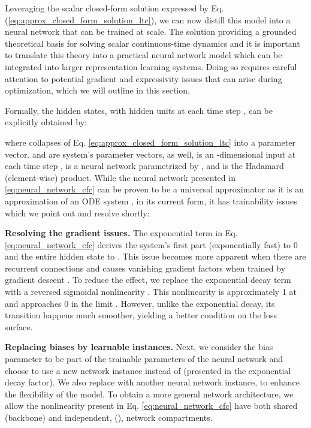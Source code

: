 \documentclass[12pt]{article}
\begin{document}
Leveraging the scalar closed-form solution expressed by Eq. (\ref{eq:approx_closed_form_solution_ltc}), we can now distill this model into a neural network that can be trained at scale. The solution providing a grounded theoretical basis for solving scalar continuous-time dynamics and it is important to translate this theory into a practical neural network model which can be integrated into larger representation learning systems. Doing so requires careful attention to potential gradient and expressivity issues that can arise during optimization, which we will outline in this section. 

\noindent Formally, the hidden states,  with  hidden units at each time step , can be explicitly obtained by:


where  collapses  of Eq. \ref{eq:approx_closed_form_solution_ltc} into a parameter vector.  and  are system's parameter vectors, as well,  is an -dimensional input at each time step ,  is a neural network parametrized by , and  is the Hadamard (element-wise) product. 
While the neural network presented in \ref{eq:neural_network_cfc} can be proven to be a universal approximator as it is an approximation of an ODE system \cite{chen2018neural,hasani2021liquid}, in its current form, it has trainability issues which we point out and resolve shortly:

\noindent \textbf{Resolving the gradient issues.} The exponential term in Eq. \ref{eq:neural_network_cfc} derives the system's first part (exponentially fast) to 0 and the entire hidden state to . This issue becomes more apparent when there are recurrent connections and causes vanishing gradient factors when trained by gradient descent \cite{hochreiter1991untersuchungen}. To reduce the effect, we replace the exponential decay term with a reversed sigmoidal nonlinearity . This nonlinearity is approximately 1 at  and approaches 0 in the limit . However, unlike the exponential decay, its transition happens much smoother, yielding a better condition on the loss surface.

\noindent \textbf{Replacing biases by learnable instances.} Next, we consider the bias parameter  to be part of the trainable parameters of the neural network  and choose to use a new network instance instead of  (presented in the exponential decay factor). We also replace  with another neural network instance,  to enhance the flexibility of the model. To obtain a more general network architecture, we allow the nonlinearity  present in Eq. \ref{eq:neural_network_cfc} have both shared (backbone) and independent, (), network compartments.
\end{document}
